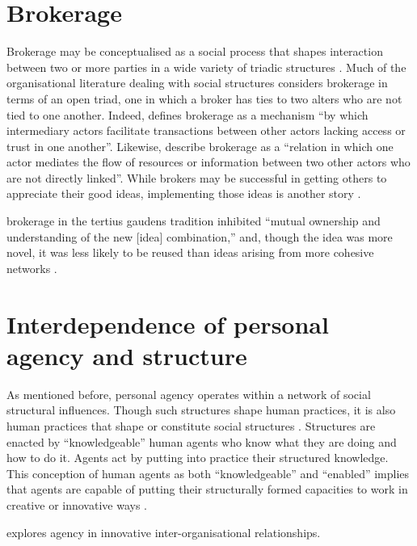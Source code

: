 \section{Brokerage}
Brokerage may be conceptualised as a social process that shapes interaction between two or more parties in a wide variety of triadic structures \citep{obstfeld2002knowledge}. Much of the organisational literature dealing with social structures considers brokerage in terms of an open triad, one in which a broker has ties to two alters who are not tied to one another. Indeed, \citet{marsden1982brokerage} defines brokerage as a mechanism \enquote{by which intermediary actors facilitate transactions between other actors lacking access or trust in one another}. Likewise, \citet{fernandez1994dilemma} describe brokerage as a \enquote{relation in which one actor mediates the flow of resources or information between two other actors who are not directly linked}. While brokers may be successful in getting others to appreciate their good ideas, implementing those ideas is another story \citep{marabelli2016}.\medskip

brokerage in the  tertius gaudens  tradition inhibited “mutual ownership and understanding of the new [idea] combination,” and, though the idea was more novel, it was less likely to be reused than ideas arising from more cohesive networks \citep{marabelli2016}.

\section{Interdependence of personal agency and structure}

As mentioned before, personal agency operates within a network of social structural influences. Though such structures shape human practices, it is also human practices that shape or constitute social structures \citep{sewell1992theory}. Structures are enacted by \enquote{knowledgeable} human agents who know what they are doing and how to do it. Agents act by putting into practice their structured knowledge. This conception of human agents as both \enquote{knowledgeable} and \enquote{enabled} implies that agents are capable of putting their structurally formed capacities to work in creative or innovative ways \citep{giddens1984constitution}. \medskip

\citet{davis2010agency} explores agency in innovative inter-organisational relationships.




